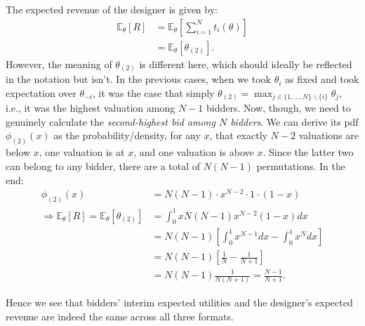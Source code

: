 \documentclass[a4paper]{article}
\begin{document}
The expected revenue of the designer is given by:
\begin{align*}
	\mathbb{E}_\theta [R]
	&= \mathbb{E}_\theta \left[ \sum_{i=1}^N t_i(\theta) \right]
	\\
	&= \mathbb{E}_\theta \left[ \theta_{(2)} \right].
\end{align*}
However, the meaning of $\theta_{(2)}$ is different here, which should ideally be reflected in the notation but isn't. In the previous cases, when we took $\theta_i$ as fixed and took expectation over $\theta_{-i}$, it was the case that simply $\theta_{(2)} = \max_{j \in \{1,...,N\} \backslash \{i\}} \theta_j$, i.e., it was the highest valuation among $N-1$ bidders. Now, though, we need to genuinely calculate the \emph{second-highest bid among $N$ bidders}. We can derive its pdf $\phi_{(2)}(x)$ as the probability/density, for any $x$, that exactly $N-2$ valuations are below $x$, one valuation is at $x$, and one valuation is above $x$. Since the latter two can belong to any bidder, there are a total of $N(N-1)$ permutations. In the end:
\begin{align*}
	\phi_{(2)}(x) &= N (N-1) \cdot x^{N-2} \cdot 1 \cdot (1-x)
	\\ \Rightarrow 
	\mathbb{E}_\theta [R] = \mathbb{E}_\theta \left[ \theta_{(2)} \right]
	&= \int_0^1 x N(N-1) x^{N-2} (1-x) dx
	\\
	&= N(N-1) \left[ \int_0^1 x^{N-1} dx - \int_0^1 x^N dx \right]
	\\
	&= N(N-1) \left[\frac{1}{N} - \frac{1}{N+1}\right]
	\\
	&= N(N-1) \frac{1}{N(N+1)} = \frac{N-1}{N+1}.
\end{align*}

Hence we see that bidders' interim expected utilities and the designer's expected revenue are indeed the same across all three formats.
\fi 



\end{document}
